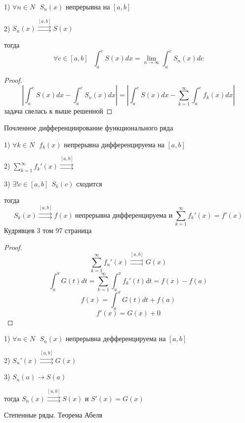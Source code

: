 \begin{theorem}
  1) $\forall n \in N ~~~ S_n(x)$ непрерывна на $[a,b]$

  2) $S_n(x) \stackrel{[a, b]}{\rightrightarrows} S(x)$

  тогда
  $$
  \forall c \in [a,b] ~~~ \int_a^c S(x)dx = \lim_{n \to \infty}
  \int_a^c S_n(x)dc
  $$
\end{theorem}

\begin{proof}
  $$
  \left| \int_a^c S(x) dx - \int_a^c S_n(x)dx \right| =
  \left| \int_a^c S(x) dx - \sum_{k=1}^{\infty} \int_a^c f_k(x)dx \right|
  $$
  задача свелась к выше решенной
\end{proof}

\begin{title}[\Large]
  Почленное дифференциирование функционального ряда
\end{title}

\begin{theorem}
  1) $\forall k \in N ~~~ f_k(x)$ непрерывна дифференцируема на $[a,b]$

  2) $\sum_{k=1}^{\infty} f_k'(x) \stackrel{[a, b]}{\rightrightarrows}$

  3) $\exists! c \in [a,b] ~~ S_k(c)$ сходится

  тогда
  $$
  S_k(x) \stackrel{[a, b]}{\rightrightarrows} f(x) ~
  \text{непрерывна дифференцируема и} ~ \sum_{k=1}^{\infty} f_k'(x) = f'(x)
  $$
  Кудрявцев 3 том 97 страница
\end{theorem}

\begin{proof}
  $$
  \sum_{k=1}^{\infty} f_n'(x) \stackrel{[a,b]}{\rightrightarrows} G(x)
  $$
  $$
  \int_a^x G(t)dt = \sum_{k=1}^{\infty} \int_a^x f_k'(t) dt = f(x) - f(a)
  $$
  $$
  f(x) = \int_a^x G(t)dt + f(a)
  $$
  $$
  f'(x) = G(x) + 0
  $$
\end{proof}

\begin{theorem}
  1) $\forall n \in N ~~~ S_n(x)$ непрерывна дефференцируема на $[a,b]$

  2) $S_n'(x) \stackrel{[a,b]}{\rightrightarrows} G(x)$

  3) $S_n(a) \to S(a)$

  тогда $S_n(x) \stackrel{[a,b]}{\rightrightarrows} S(x)$ и $S'(x) = G(x)$
\end{theorem}

\begin{title}[\Large]
  Степенные ряды. Теорема Абеля
\end{title}

